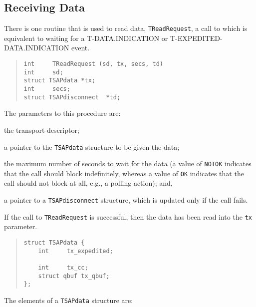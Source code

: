 \subsection	{Receiving Data}
There is one routine that is used to read data,
\verb"TReadRequest",
a call to which is equivalent to waiting for a {\sf T-DATA.INDICATION\/}
or {\sf T-EXPEDITED-DA\-TA.IN\-DI\-CA\-TION} event.
\begin{quote}\small\begin{verbatim}
int     TReadRequest (sd, tx, secs, td)
int     sd;
struct TSAPdata *tx;
int     secs;
struct TSAPdisconnect  *td;
\end{verbatim}\end{quote}
The parameters to this procedure are:
\begin{describe}
\item[\verb"sd":] the transport-descriptor;

\item[\verb"tx":] a pointer to the \verb"TSAPdata" structure to be given
the data;

\item[\verb"secs":] the maximum number of seconds to wait for the data
(a value of \verb"NOTOK" indicates that the call should block indefinitely,
whereas a value of \verb"OK" indicates that the call should not block at all,
e.g., a polling action);
and,

\item[\verb"td":] a pointer to a \verb"TSAPdisconnect" structure, which is
updated only if the call fails.
\end{describe}
If the call to \verb"TReadRequest" is successful,
then the data has been read into the \verb"tx" parameter.
\begin{quote}\small\begin{verbatim}
struct TSAPdata {
    int     tx_expedited;

    int     tx_cc;
    struct qbuf tx_qbuf;
};
\end{verbatim}\end{quote}
The elements of a \verb"TSAPdata" structure are:
